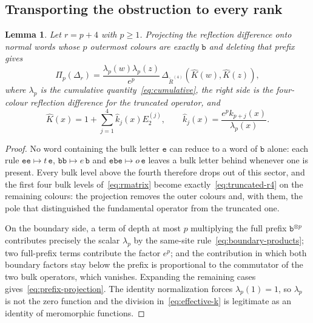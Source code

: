 \documentclass[
  aps,pre,
  reprint,
  superscriptaddress,
  amsmath,amssymb,
  floatfix
]{revtex4-2}
\theoremstyle{plain}
\newtheorem{lemma}[theorem]{Lemma}
\theoremstyle{definition}
\theoremstyle{remark}
\begin{document}
\subsection{Transporting the obstruction to every rank}

\begin{lemma}
\label{lem:projection}
Let $r=p+4$ with $p\ge1$. Projecting the reflection difference onto normal
words whose $p$ outermost colours are exactly $\mathtt{b}$ and deleting that
prefix gives
\begin{equation}
 \Pi_p(\Delta_r)=
 \frac{\lambda_p(w)\lambda_p(z)}{e^{p}}\,
 \Delta_{\widetilde R^{(4)}}\!\left(\widehat K(w),\widehat K(z)\right),
 \label{eq:prefix-projection}
\end{equation}
where $\lambda_p$ is the cumulative quantity~\eqref{eq:cumulative}, the right
side is the four-colour reflection difference for the truncated operator, and
\begin{equation}
 \widehat K(x)=1+\sum_{j=1}^{4}\widehat k_j(x)E_2^{(j)},\qquad
 \widehat k_j(x)=\frac{e^{p}k_{p+j}(x)}{\lambda_p(x)} .
 \label{eq:effective-k}
\end{equation}
\end{lemma}

\begin{proof}
No word containing the bulk letter $\mathtt{e}$ can reduce to a word of
$\mathtt{b}$ alone: each rule $\mathtt{ee}\mapsto t\,\mathtt{e}$,
$\mathtt{bb}\mapsto e\,\mathtt{b}$ and $\mathtt{ebe}\mapsto o\,\mathtt{e}$
leaves a bulk letter behind whenever one is present. Every bulk level above the
fourth therefore drops out of this sector, and the first four bulk levels
of~\eqref{eq:rmatrix} become exactly~\eqref{eq:truncated-r4} on the remaining
colours: the projection removes the outer colours and, with them, the pole that
distinguished the fundamental operator from the truncated one.

On the boundary side, a term of depth at most $p$ multiplying the full prefix
$\mathtt{b}^{\otimes p}$ contributes precisely the scalar $\lambda_p$ by the
same-site rule~\eqref{eq:boundary-products}; two full-prefix terms contribute
the factor $e^{p}$; and the contribution in which both boundary factors stay
below the prefix is proportional to the commutator of the two bulk operators,
which vanishes. Expanding the remaining cases
gives~\eqref{eq:prefix-projection}. The identity normalization forces
$\lambda_p(1)=1$, so $\lambda_p$ is not the zero function and the division
in~\eqref{eq:effective-k} is legitimate as an identity of meromorphic
functions.
\end{proof}
\end{document}
